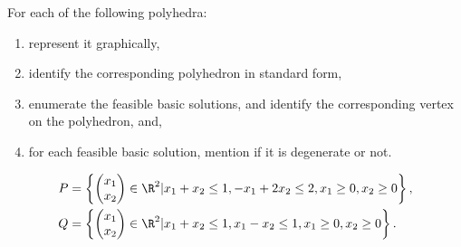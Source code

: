 
For each of the following polyhedra:
\begin{enumerate}
\item represent it graphically,
\item identify the corresponding polyhedron in standard form,
\item enumerate the feasible basic solutions, and identify the
  corresponding vertex on the polyhedron, and,
\item for each feasible basic solution, mention if it is degenerate or
  not.  
\end{enumerate}

\begin{align*}
P &= \left\{
\begin{pmatrix}
x_1\\
x_2
\end{pmatrix} \in \R^2
| x_1+x_2 \leq 1,
-x_1+2x_2 \leq 2, x_1 \geq 0, x_2 \geq 0 \right\}, \\
Q &= \left\{
\begin{pmatrix}
x_1\\
x_2
\end{pmatrix} \in \R^2
| x_1 + x_2 \leq 1, x_1 - x_2 \leq 1, x_1 \geq 0, x_2 \geq 0\right\}.
\end{align*}



